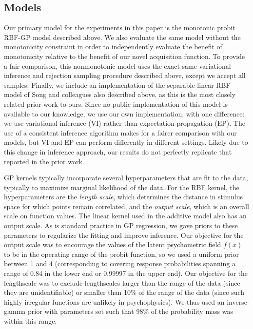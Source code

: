 \documentclass[../main.tex]{subfiles}
\begin{document}
\subsection{Models}

Our primary model for the experiments in this paper is the monotonic probit RBF-GP model described above. We also evaluate the same model without the monotonicity constraint in order to independently evaluate the benefit of monotonicity relative to the benefit of our novel acquisition function. To provide a fair comparison, this nonmonotonic model uses the exact same variational inference and rejection sampling procedure described above, except we accept all samples. Finally, we include an implementation of the separable linear-RBF model of Song and colleagues also described above, as this is the most closely related prior work to ours. Since no public implementation of this model is available to our knowledge, we use our own implementation, with one difference: we use variational inference (VI) rather than expectation propagation (EP). The use of a consistent inference algorithm makes for a fairer comparison with our models, but VI and EP can perform differently in different settings. Likely due to this change in inference approach, our results do not perfectly replicate that reported in the prior work.

GP kernels typically incorporate several hyperparameters that are fit to the data, typically to maximize marginal likelihood of the data. For the RBF kernel, the hyperparameters are the \emph{length scale}, which determines the distance in stimulus space for which points remain correlated, and the \emph{output scale}, which is an overall scale on function values. The linear kernel used in the additive model also has an output scale. As is standard practice in GP regression, we gave priors to these parameters to regularize the fitting and improve inference. Our objective for the output scale was to encourage the values of the latent psychometric field $f(x)$ to be in the operating range of the probit function, so we used a uniform prior between 1 and 4 (corresponding to covering response probabilities spanning a range of 0.84 in the lower end or 0.99997 in the upper end). Our objective for the lengthscale was to exclude lengthscales larger than the range of the data (since they are unidentifiable) or smaller than 10\% of the range of the data (since such highly irregular functions are unlikely in psychophysics). We thus used an inverse-gamma prior with parameters set such that 98\% of the probability mass was within this range.
\end{document}
